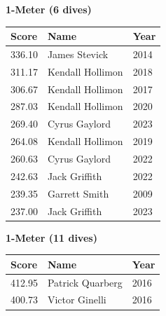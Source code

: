 \vspace{1.2em}
\noindent\begin{minipage}[t]{0.48\textwidth}
\centering
\textbf{\textcolor{teamprimary}{1-Meter (6 dives)}}\par
\vspace{0.5em}
\centering
\small
\renewcommand{\arraystretch}{1.0}
\setlength{\tabcolsep}{4pt}
\begin{tabular}{@{}p{1.8cm}p{3.0cm}p{1.0cm}@{}}
\toprule
\textbf{Score} & \textbf{Name} & \textbf{Year} \\
\midrule
336.10 & James Stevick & 2014 \\
311.17 & Kendall Hollimon & 2018 \\
306.67 & Kendall Hollimon & 2017 \\
287.03 & Kendall Hollimon & 2020 \\
269.40 & Cyrus Gaylord & 2023 \\
264.08 & Kendall Hollimon & 2019 \\
260.63 & Cyrus Gaylord & 2022 \\
242.63 & Jack Griffith & 2022 \\
239.35 & Garrett Smith & 2009 \\
237.00 & Jack Griffith & 2023 \\
\bottomrule
\end{tabular}
\end{minipage}
\hfill
\begin{minipage}[t]{0.48\textwidth}
\centering
\textbf{\textcolor{teamprimary}{1-Meter (11 dives)}}\par
\vspace{0.5em}
\centering
\small
\renewcommand{\arraystretch}{1.0}
\setlength{\tabcolsep}{4pt}
\begin{tabular}{@{}p{1.8cm}p{3.0cm}p{1.0cm}@{}}
\toprule
\textbf{Score} & \textbf{Name} & \textbf{Year} \\
\midrule
412.95 & Patrick Quarberg & 2016 \\
400.73 & Victor Ginelli & 2016 \\
\bottomrule
\end{tabular}
\end{minipage}
\vspace{1.2em}
